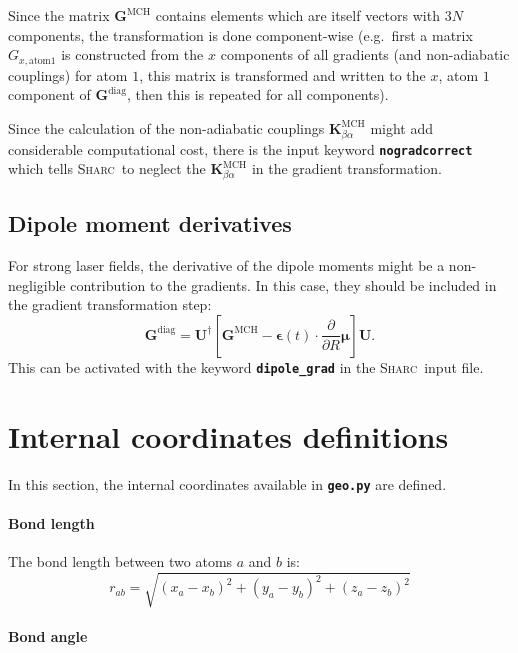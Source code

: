 \documentclass[a4paper,11pt,DIV=15,openany,twoside=false]{scrbook}
\newcommand{\sharc}{\textsc{Sharc}}
\newcommand{\ttt}[1]{\textbf{\texttt{#1}}}
\newcommand{\VEC}[1]{\ensuremath{\mathbf{#1}}}
\begin{document}
Since the matrix $\VEC{G}^{\text{MCH}}$ contains elements which are itself vectors with $3N$ components, the transformation is done component-wise (e.g.\ first a matrix $G_{x,\text{atom} 1}$ is constructed from the $x$ components of all gradients (and non-adiabatic couplings) for atom $1$, this matrix is transformed and written to the $x$, atom $1$ component of $\VEC{G}^{\text{diag}}$, then this is repeated for all components).

Since the calculation of the non-adiabatic couplings $\VEC{K}^{\text{MCH}}_{\beta\alpha}$ might add considerable computational cost, there is the input keyword \ttt{nogradcorrect} which tells \sharc\ to neglect the $\VEC{K}^{\text{MCH}}_{\beta\alpha}$ in the gradient transformation.

\subsection{Dipole moment derivatives}\label{met:dipolegrad}

For strong laser fields, the derivative of the dipole moments might be a non-negligible contribution to the gradients. In this case, they should be included in the gradient transformation step:
\begin{equation}
  \VEC{G}^{\text{diag}}=\VEC{U}^\dagger
  \left[
    \VEC{G}^{\text{MCH}}
    -\boldsymbol{\epsilon}(t)\cdot\frac{\partial}{\partial R}\boldsymbol{\mu}
  \right]\VEC{U}.
\end{equation}
This can be activated with the keyword \ttt{dipole\_grad} in the \sharc\ input file.


\section{Internal coordinates definitions}\label{met:geo}

In this section, the internal coordinates available in \ttt{geo.py} are defined.

\paragraph{Bond length}

The bond length between two atoms $a$ and $b$ is:
\begin{equation}
  r_{ab}=
  \sqrt{
    (x_a-x_b)^2+(y_a-y_b)^2+(z_a-z_b)^2
  }
\end{equation}

\paragraph{Bond angle}
\end{document}
